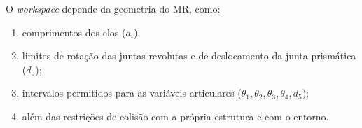 O \emph{workspace} depende da geometria do MR, como:
\begin{enumerate}[label=\roman*)]
    \item comprimentos dos elos ($a_i$);
    \item limites de rotação das juntas revolutas e de deslocamento da junta prismática ($d_5$);
    \item intervalos permitidos para as variáveis articulares ($\theta_1,\theta_2,\theta_3,\theta_4,d_5$);
    \item além das restrições de colisão com a própria estrutura e com o entorno.
\end{enumerate}

